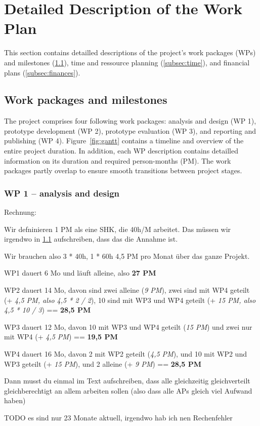 \clearpage
\section{Detailed Description of the Work Plan}

This section contains detailled descriptions of the project's work packages (WPs) and milestones (\cref{subsec:wp}), time and ressource planning (\cref{subsec:time}), and financial plans (\cref{subsec:finances}).

\subsection{Work packages and milestones}\label{subsec:wp}

The project comprises four following work packages: analysis and design (WP 1), prototype development (WP 2), prototype evaluation (WP 3), and reporting and publishing (WP 4).
Figure~\ref{fig:gantt} contains a timeline and overview of the entire project duration.
In addition, each WP description contains detailled information on its duration and required person-months (PM).
The work packages partly overlap to ensure smooth transitions between project stages.

\subsubsection{WP 1 -- analysis and design}

{
\color{blue}
Rechnung:

Wir defninieren 1 PM als eine SHK, die 40h/M arbeitet. Das müssen wir irgendwo in \cref{subsec:wp} aufschreiben, dass das die Annahme ist.

Wir brauchen also 3 * 40h, 1 * 60h \textrightarrow{} 4,5 PM pro Monat über das ganze Projekt.

WP1 dauert 6 Mo und läuft alleine, also \textbf{27 PM}

WP2 dauert 14 Mo, davon sind zwei alleine (\textit{9 PM}), zwei sind mit WP4 geteilt (+ \textit{4,5 PM, also 4,5 * 2 / 2}), 10 sind mit WP3 und WP4 geteilt (+ \textit{15 PM, also 4,5 * 10 / 3}) == \textbf{28,5 PM}

WP3 dauert 12 Mo, davon 10 mit WP3 und WP4 geteilt (\textit{15 PM}) und zwei nur mit WP4 (+ \textit{4,5 PM}) == \textbf{19,5 PM}

WP4 dauert 16 Mo, davon 2 mit WP2 geteilt (\textit{4,5 PM}), und 10 mit WP2 und WP3 geteilt (+ \textit{15 PM}), und 2 alleine (+ \textit{9 PM}) == \textbf{28,5 PM}

Dann musst du einmal im Text aufschreiben, dass alle gleichzeitig gleichverteilt gleichberechtigt an allem arbeiten sollen (also dass alle APs gleich viel Aufwand haben)

TODO es sind nur 23 Monate aktuell, irgendwo hab ich nen Rechenfehler
}

